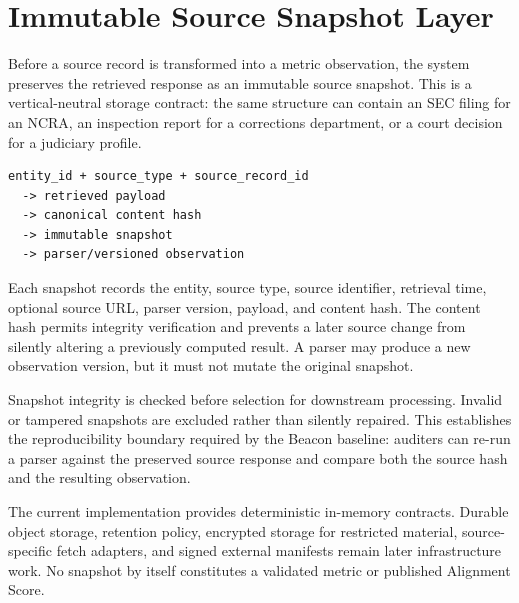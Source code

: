 \section{Immutable Source Snapshot Layer}

Before a source record is transformed into a metric observation, the system
preserves the retrieved response as an immutable source snapshot. This is a
vertical-neutral storage contract: the same structure can contain an SEC
filing for an NCRA, an inspection report for a corrections department, or a
court decision for a judiciary profile.

\begin{lstlisting}
entity_id + source_type + source_record_id
  -> retrieved payload
  -> canonical content hash
  -> immutable snapshot
  -> parser/versioned observation
\end{lstlisting}

Each snapshot records the entity, source type, source identifier, retrieval
time, optional source URL, parser version, payload, and content hash. The
content hash permits integrity verification and prevents a later source
change from silently altering a previously computed result. A parser may
produce a new observation version, but it must not mutate the original
snapshot.

Snapshot integrity is checked before selection for downstream processing.
Invalid or tampered snapshots are excluded rather than silently repaired.
This establishes the reproducibility boundary required by the Beacon baseline:
auditers can re-run a parser against the preserved source response and compare
both the source hash and the resulting observation.

The current implementation provides deterministic in-memory contracts. Durable
object storage, retention policy, encrypted storage for restricted material,
source-specific fetch adapters, and signed external manifests remain later
infrastructure work. No snapshot by itself constitutes a validated metric or
published Alignment Score.
